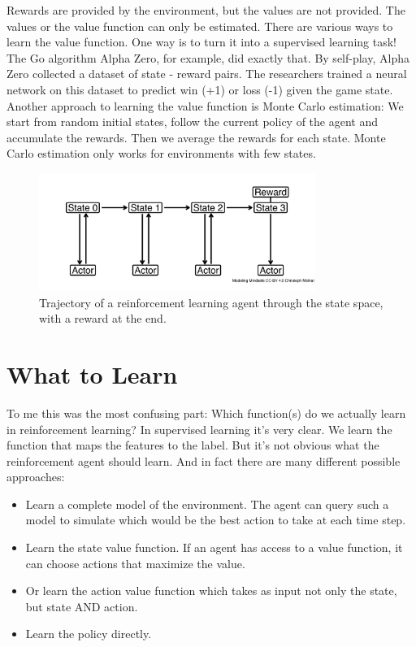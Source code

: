 \documentclass[
  10pt,
]{scrbook}
\providecommand{\tightlist}{%
  \setlength{\itemsep}{0pt}\setlength{\parskip}{0pt}}
\begin{document}
Rewards are provided by the environment, but the values are not provided.
The values or the value function can only be estimated.
There are various ways to learn the value function.
One way is to turn it into a supervised learning task!
The Go algorithm Alpha Zero, for example, did exactly that.
By self-play, Alpha Zero collected a dataset of state - reward pairs.
The researchers trained a neural network on this dataset to predict win (+1) or loss (-1) given the game state.
Another approach to learning the value function is Monte Carlo estimation:
We start from random initial states, follow the current policy of the agent and accumulate the rewards.
Then we average the rewards for each state.
Monte Carlo estimation only works for environments with few states.

\begin{figure}

{\centering \includegraphics[width=0.8\textwidth]{figures/rl-trajectory-1} 

}

\caption{Trajectory of a reinforcement learning agent through the state space, with a reward at the end.}\label{fig:rl-trajectory}
\end{figure}

\hypertarget{what-to-learn}{%
\section{What to Learn}\label{what-to-learn}}

To me this was the most confusing part: Which function(s) do we actually learn in reinforcement learning?
In supervised learning it's very clear.
We learn the function that maps the features to the label.
But it's not obvious what the reinforcement agent should learn.
And in fact there are many different possible approaches:

\begin{itemize}
\tightlist
\item
  Learn a complete model of the environment. The agent can query such a model to simulate which would be the best action to take at each time step.
\item
  Learn the state value function. If an agent has access to a value function, it can choose actions that maximize the value.
\item
  Or learn the action value function which takes as input not only the state, but state AND action.
\item
  Learn the policy directly.
\end{itemize}
\end{document}
